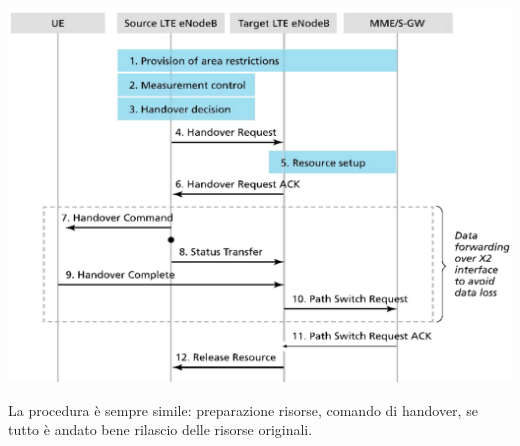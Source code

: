 \begin{center}
	\includegraphics[width=0.94\linewidth]{img/4g/hand2}
\end{center}

La procedura è sempre simile: preparazione risorse, comando di handover, se tutto è andato bene rilascio delle risorse originali.